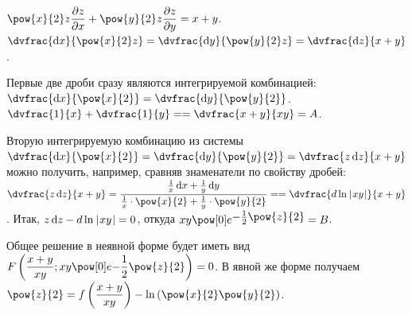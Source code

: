 \documentclass[a5paper,10pt]{article}
\begin{document}
    $\pow{x}{2} z \parder{z} {x} + \pow{y}{2} z \parder{z} {y} = x + y$.
    $\dvfrac {\di x} {\pow{x}{2} z} = \dvfrac {\di y} {\pow{y}{2} z} = \dvfrac {\di z} {x + y}$.

    Первые две дроби сразу являются интегрируемой комбинацией:
    $\dvfrac {\di x} {\pow{x}{2}} = \dvfrac {\di y} {\pow{y}{2}}$.
    $\dvfrac {1} {x} + \dvfrac {1} {y} = \linebreak = \dvfrac {x + y} {xy} = A$.

    Вторую интегрируемую комбинацию из системы
    $\dvfrac {\di x} {\pow{x}{2}} = \dvfrac {\di y} {\pow{y}{2}} = \dvfrac {z \di z} {x + y}$
    можно получить, например, сравняв знаменатели по свойству дробей:
    $\dvfrac {z \di z} {x + y}
    = \dfrac {\frac {1} {x} \di x + \frac {1} {y} \di y} {\frac {1} {x} \cdot \pow{x}{2}
        + \frac {1} {y} \cdot \pow{y}{2}} = \linebreak
    = \dvfrac {d\ln\vbr{xy}} {x + y}$.
    Итак,
    $z \di z - d\ln\vbr{xy} = 0$, откуда
    $xy \tpow{e}{\elevate{-\frac {1} {2} \pow{z}{2}}} = B$.

    Общее решение в неявной форме будет иметь вид
    $F\br{\dfrac {x + y} {xy}; xy \tpow{e}{-\frac {1} {2} \pow{z}{2}}} = 0$.
    В явной же форме получаем
    $\pow{z}{2} = f\br{\dfrac {x + y} {xy}} - \ln\br{\pow{x}{2} \pow{y}{2}}$.
\end{document}
